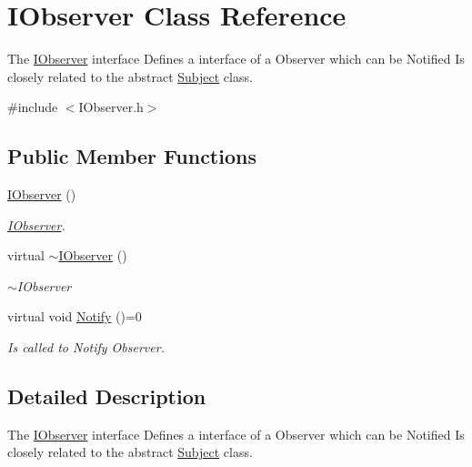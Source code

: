 \hypertarget{classIObserver}{\section{I\-Observer Class Reference}
\label{classIObserver}
}


The \hyperlink{classIObserver}{I\-Observer} interface Defines a interface of a Observer which can be Notified Is closely related to the abstract \hyperlink{classSubject}{Subject} class.  




{\ttfamily \#include $<$I\-Observer.\-h$>$}

\subsection*{Public Member Functions}
\begin{DoxyCompactItemize}
\item 
\hypertarget{classIObserver_a7e478961d27e1c605699e2b32fbdc29b}{\hyperlink{classIObserver_a7e478961d27e1c605699e2b32fbdc29b}{I\-Observer} ()}\label{classIObserver_a7e478961d27e1c605699e2b32fbdc29b}

\begin{DoxyCompactList}\small\item\em \hyperlink{classIObserver}{I\-Observer}. \end{DoxyCompactList}\item 
\hypertarget{classIObserver_afdfe9e2ebd9aa794142968de574daa9a}{virtual \hyperlink{classIObserver_afdfe9e2ebd9aa794142968de574daa9a}{$\sim$\-I\-Observer} ()}\label{classIObserver_afdfe9e2ebd9aa794142968de574daa9a}

\begin{DoxyCompactList}\small\item\em $\sim$\-I\-Observer \end{DoxyCompactList}\item 
\hypertarget{classIObserver_ad46021c61f1fa2126078f33783adc727}{virtual void \hyperlink{classIObserver_ad46021c61f1fa2126078f33783adc727}{Notify} ()=0}\label{classIObserver_ad46021c61f1fa2126078f33783adc727}

\begin{DoxyCompactList}\small\item\em Is called to Notify Observer. \end{DoxyCompactList}\end{DoxyCompactItemize}


\subsection{Detailed Description}
The \hyperlink{classIObserver}{I\-Observer} interface Defines a interface of a Observer which can be Notified Is closely related to the abstract \hyperlink{classSubject}{Subject} class. 